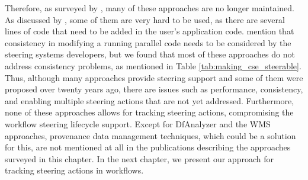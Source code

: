 Therefore, as surveyed by \citet{Bauer2016In}, many of these approaches are no
longer maintained.
As discussed by \citet{Figueira2004CS_LITE:}, some of them are very hard to be used,
as there are several lines of code that need to be added in the user's
application code.
\citet{Hart1999Consistency}
mention that consistency in modifying a running parallel code needs to
be considered by the steering systems developers, but we found that most
of these approaches do not address consistency problems, as mentioned in
Table \ref{tab:making_cse_steerable}.
Thus, although many approaches provide steering support and some
of them were proposed over twenty years ago, there are issues such as performance, consistency, and enabling multiple
steering actions that are not yet addressed.
Furthermore, none of these approaches allows for tracking steering actions, compromising the workflow steering lifecycle support. Except for DfAnalyzer and the WMS approaches, provenance data management techniques, which could be a solution for this, are not mentioned at all in the publications describing the approaches surveyed in this chapter.
In the next chapter, we present our approach for tracking steering actions in workflows.
